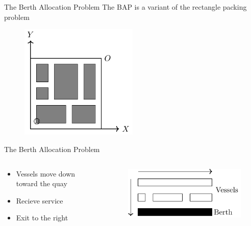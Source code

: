 \documentclass[bigger]{beamer}
\begin{document}
\begin{frame}[label={sec:orgaee3668}]{The Berth Allocation Problem}
The BAP is a variant of the rectangle packing problem

\begin{figure}[htpb]
\centering
    \includegraphics[width=0.5\textwidth]{img/spatiotemporal-packing}
\end{figure}
\end{frame}

\begin{frame}[label={sec:orgb5f7cd6}]{The Berth Allocation Problem}
\begin{columns}
\begin{column}{0.5\columnwidth}
\begin{itemize}
\item Vessels move down toward the quay
\item Recieve service
\item Exit to the right
\end{itemize}
\end{column}

\begin{column}{0.5\columnwidth}
\begin{figure}[htpb]
\centering
    \includegraphics{img/bap}
    \label{subfig:bapexample}
\end{figure}
\end{column}
\end{columns}
\end{frame}
\end{document}
